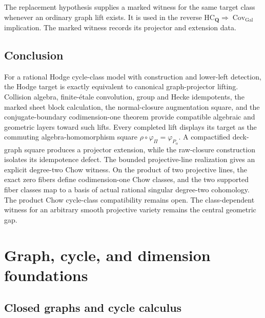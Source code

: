\documentclass[11pt]{article}
\theoremstyle{definition}
\theoremstyle{remark}
\newcommand{\Q}{\mathbf Q}
\begin{document}
The replacement hypothesis supplies a marked witness for the same target
class whenever an ordinary graph lift exists. It is used in the reverse
\(\mathrm{HC}_{\Q}\Rightarrow\operatorname{Cov}_{\mathrm{Gal}}\) implication.
The marked witness records its projector and extension data.

\subsection*{Conclusion}

For a rational Hodge cycle-class model with construction and lower-left
detection, the Hodge target is exactly equivalent to canonical
graph-projector lifting.  Collision
algebra, finite-\'etale convolution, group and Hecke idempotents, the marked
sheet block calculation, the normal-closure augmentation square, and the
conjugate-boundary codimension-one theorem provide compatible algebraic and
geometric layers toward such lifts.  Every completed lift displays its target
as the commuting algebra-homomorphism square
\(\rho\circ\varphi_\Pi=\varphi_{P_\alpha}\).  A compactified deck-graph square produces a projector extension, while
the raw-closure construction isolates its idempotence defect.
The bounded projective-line realization gives an explicit degree-two Chow
witness. On the product of two projective lines, the exact zero fibers define
codimension-one Chow classes, and the two supported fiber classes map to a
basis of actual rational singular degree-two cohomology. The product Chow
cycle-class compatibility remains open.
The class-dependent witness for an arbitrary smooth
projective variety remains the central geometric gap.

\appendix

\section{Graph, cycle, and dimension foundations}
\label{app:foundations}

\subsection{Closed graphs and cycle calculus}
\label{app:graph-calculus}
\end{document}
